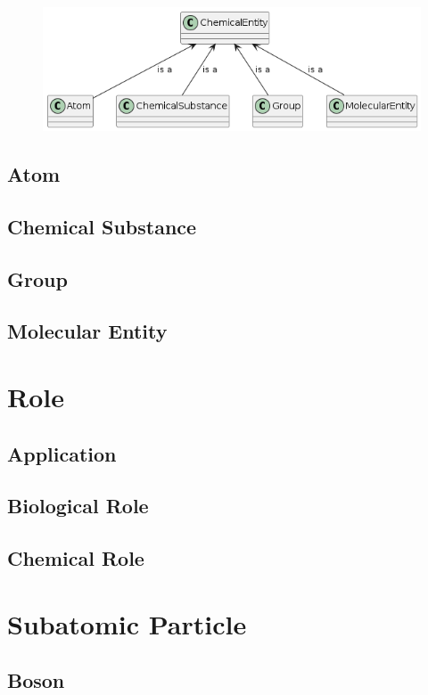 \documentclass[12pt,a4paper,openright,twoside]{book}
\begin{document}
\begin{figure}
	\centering
	\includegraphics[width=\linewidth]{figures/chemical-entity.png}
	\caption{}
	\label{fig:ChemicalEntity}
\end{figure}

\subsection{Atom}
\subsection{Chemical Substance}
\subsection{Group}
\subsection{Molecular Entity}

\section{Role}
\subsection{Application}
\subsection{Biological Role}
\subsection{Chemical Role}

\section{Subatomic Particle}
\subsection{Boson}
\end{document}
